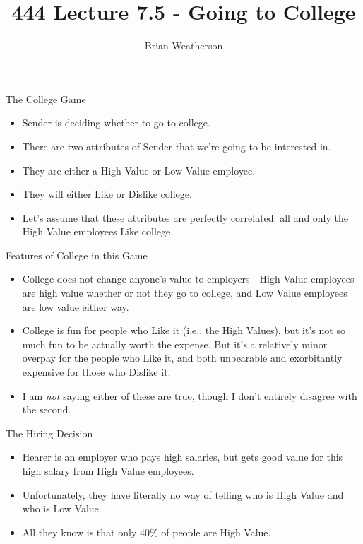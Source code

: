 \documentclass[
  ignorenonframetext,
]{beamer}
\title{444 Lecture 7.5 - Going to College}
\author{Brian Weatherson}
\date{}
\providecommand{\tightlist}{%
  \setlength{\itemsep}{0pt}\setlength{\parskip}{0pt}}
\begin{document}
\frame{\titlepage}

\begin{frame}{The College Game}
\protect\hypertarget{the-college-game}{}
\begin{itemize}
\tightlist
\item
  Sender is deciding whether to go to college.
\item
  There are two attributes of Sender that we're going to be interested
  in.
\item
  They are either a High Value or Low Value employee.
\item
  They will either Like or Dislike college.
\item
  Let's assume that these attributes are perfectly correlated: all and
  only the High Value employees Like college.
\end{itemize}
\end{frame}

\begin{frame}{Features of College in this Game}
\protect\hypertarget{features-of-college-in-this-game}{}
\begin{itemize}[<+->]
\tightlist
\item
  College does not change anyone's value to employers - High Value
  employees are high value whether or not they go to college, and Low
  Value employees are low value either way.
\item
  College is fun for people who Like it (i.e., the High Values), but
  it's not so much fun to be actually worth the expense. But it's a
  relatively minor overpay for the people who Like it, and both
  unbearable and exorbitantly expensive for those who Dislike it.
\item
  I am \emph{not} saying either of these are true, though I don't
  entirely disagree with the second.
\end{itemize}
\end{frame}

\begin{frame}{The Hiring Decision}
\protect\hypertarget{the-hiring-decision}{}
\begin{itemize}
\tightlist
\item
  Hearer is an employer who pays high salaries, but gets good value for
  this high salary from High Value employees.
\item
  Unfortunately, they have literally no way of telling who is High Value
  and who is Low Value.
\item
  All they know is that only 40\% of people are High Value.
\end{itemize}
\end{frame}
\end{document}
